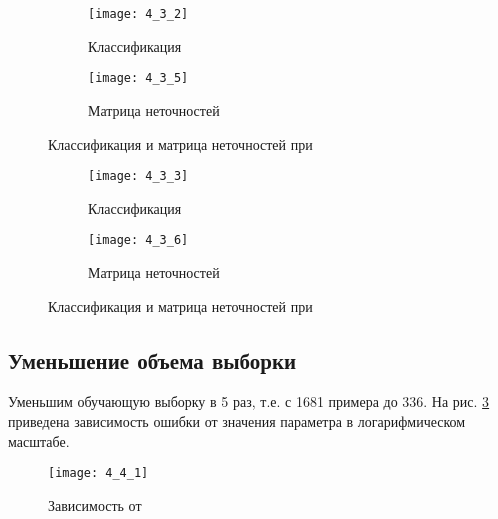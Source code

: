 \begin{figure}[H]
\begin{center}
	\begin{subfigure}{0.49\textwidth}
		\texttt{[image: 4\_3\_2]}
		\caption{Классификация}
	\end{subfigure}
	\begin{subfigure}{0.49\textwidth}
		\texttt{[image: 4\_3\_5]}
		\caption{Матрица неточностей}
	\end{subfigure}
	\caption{Классификация и матрица неточностей при }
	\label{fig:3_2_4}
\end{center}
\end{figure}

\begin{figure}[H]
\begin{center}
	\begin{subfigure}{0.49\textwidth}
		\texttt{[image: 4\_3\_3]}
		\caption{Классификация}
	\end{subfigure}
	\begin{subfigure}{0.49\textwidth}
		\texttt{[image: 4\_3\_6]}
		\caption{Матрица неточностей}
	\end{subfigure}
	\caption{Классификация и матрица неточностей при }
	\label{fig:3_2_4}
\end{center}
\end{figure}

\subsection{Уменьшение объема выборки}


Уменьшим обучающую выборку в 5 раз, т.е. с 1681 примера до 336. На рис. \ref{fig:4_4_1} приведена зависимость ошибки  от значения параметра  в логарифмическом масштабе. 
\vspace{-0.5cm}
\begin{figure}[H]
\begin{center}
	\texttt{[image: 4\_4\_1]}
	\caption{Зависимость  от }
	\label{fig:4_4_1}
\end{center}
\end{figure}
\vspace{-0.5cm}

